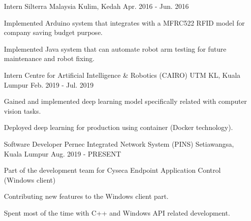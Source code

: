

\begin{cventries}

  \cventry
    {Intern}
    {Silterra Malaysia}
    {Kulim, Kedah}
    {Apr. 2016 - Jun. 2016}
    {
      \begin{cvitems}
        \item {Implemented Arduino system that integrates with a MFRC522 RFID model for company saving budget purpose.}
        \item {Implemented Java system that can automate robot arm testing for future maintenance and robot fixing.}
      \end{cvitems}
    }

  \cventry
    {Intern}
    {Centre for Artificial Intelligence \& Robotics (CAIRO)}
    {UTM KL, Kuala Lumpur}
    {Feb. 2019 - Jul. 2019}
    {
      \begin{cvitems}
        \item {Gained and implemented deep learning model specifically related with computer vision tasks.}
        \item {Deployed deep learning for production using container (Docker technology).}
      \end{cvitems}
    }

    \cventry
    {Software Developer}
    {Pernec Integrated Network System (PINS)}
    {Setiawangsa, Kuala Lumpur}
    {Aug. 2019 - PRESENT}
    {
      \begin{cvitems}
        \item {Part of the development team for Cyseca Endpoint Application Control (Windows client)}
        \item {Contributing new features to the Windows client part.}
        \item {Spent most of the time with C++ and Windows API related development.}
      \end{cvitems}
    }

\end{cventries}
